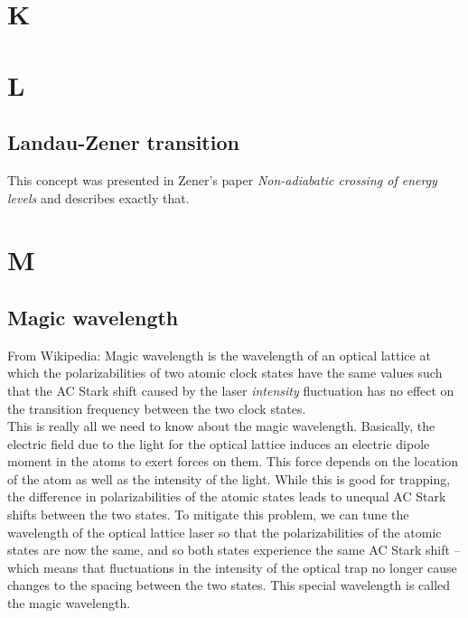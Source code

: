 \documentclass{book}
\theoremstyle{definition}
\begin{document}
\chapter*{K}
\chapter*{L}


\section*{Landau-Zener transition}


This concept was presented in Zener's paper \textit{Non-adiabatic crossing of energy levels} \cite{zener1932non} and describes exactly that. 




\chapter*{M}



\section*{Magic wavelength}



From Wikipedia: Magic wavelength is the wavelength of an optical lattice at which the polarizabilities of two atomic clock states have the same values such that the AC Stark shift caused by the laser \textit{intensity} fluctuation has no effect on the transition frequency between the two clock states.\\


This is really all we need to know about the magic wavelength. Basically, the electric field due to the light for the optical lattice induces an electric dipole moment in the atoms to exert forces on them. This force depends on the location of the atom as well as the intensity of the light. While this is good for trapping, the difference in polarizabilities of the atomic states leads to unequal AC Stark shifts between the two states. To mitigate this problem, we can tune the wavelength of the optical lattice laser so that the polarizabilities of the atomic states are now the same, and so both states experience the same AC Stark shift -- which means that fluctuations in the intensity of the optical trap no longer cause changes to the spacing between the two states. This special wavelength is called the magic wavelength. 
\end{document}
